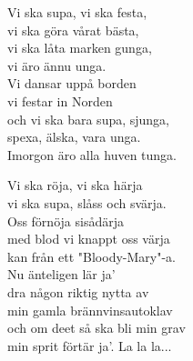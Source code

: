 \documentclass[a6paper, 10pt, twoside]{article}
\begin{document}
\begin{center}
\end{center}
\begin{lyrics}
Vi ska supa, vi ska festa,\\
vi ska göra vårat bästa,\\
vi ska låta marken gunga,\\
vi äro ännu unga.\\
Vi dansar uppå borden\\
vi festar in Norden\\
och vi ska bara supa, sjunga, \\
spexa, älska, vara unga.\\
Imorgon äro alla huven tunga.
\end{lyrics}
\begin{center}
\vspace{20pt}
\end{center}
\begin{lyrics}
Vi ska röja, vi ska härja\\
vi ska supa, slåss och svärja.\\
Oss förnöja sisådärja\\
med blod vi knappt oss värja\\
kan från ett "Bloody-Mary"-a.\\
Nu änteligen lär ja'\\
dra någon riktig nytta av\\
min gamla brännvinsautoklav\\
och om deet så ska bli min grav\\
min sprit förtär ja'.
\vspace{5pt}
La la la...
\end{lyrics}
\end{document}
